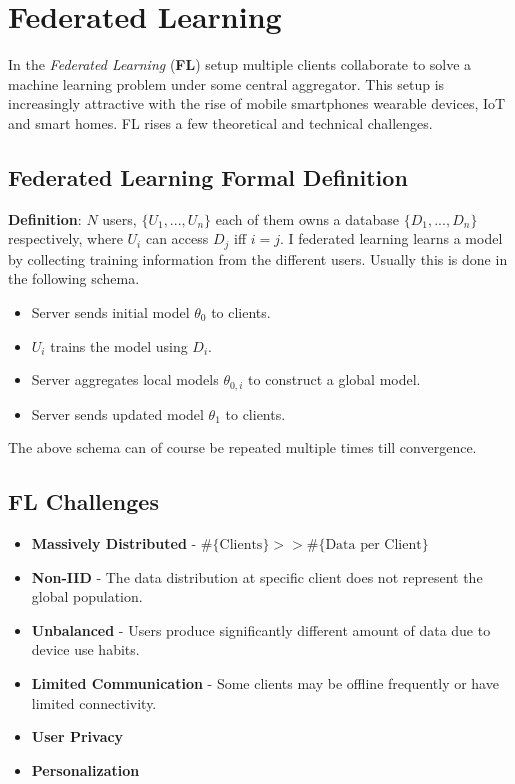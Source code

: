 \section{Federated Learning}
In the \textit{Federated Learning} (\textbf{FL}) setup multiple clients collaborate to solve a machine learning problem under some central aggregator. This setup is increasingly attractive with the rise of mobile smartphones wearable devices, IoT and smart homes. FL rises a few theoretical and technical challenges.

\subsection{Federated Learning Formal Definition}
\textbf{Definition}: $N$ users, $\{U_{1},...,U_{n}\}$ each of them owns a database  $\{D_{1},...,D_{n} \}$ respectively, where $U_{i}$ can access $D_{j}$ iff $i=j$. I federated learning learns a model by collecting training information from the different users. Usually this is done in the following schema.
\begin{itemize}
    \item Server sends initial model $\theta_{0}$ to clients.
    \item $U_{i}$ trains the model using $D_{i}$.
    \item Server aggregates local models $\theta_{0,i}$ to construct a global model.
    \item Server sends updated model $\theta_{1}$ to clients.
\end{itemize}
The above schema can of course be repeated multiple times till convergence.

\subsection{FL Challenges}
\begin{itemize}
    \item \textbf{Massively Distributed} - $\# \{ \text{Clients} \} > >  \# \{ \text{Data per Client} \}$
    \item \textbf{Non-IID} - The data distribution at specific client does not represent the global population.
    \item \textbf{Unbalanced} - Users produce significantly different amount of data due to device use habits.
    \item \textbf{Limited Communication} - Some clients may be offline frequently or have limited connectivity.               
    \item \textbf{User Privacy}
    \item \textbf{Personalization}
\end{itemize}